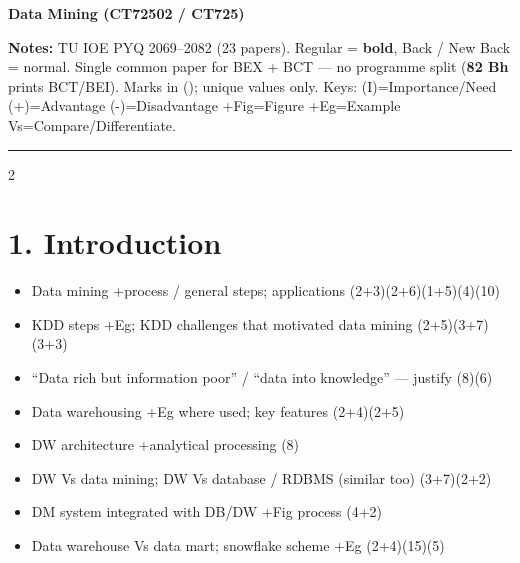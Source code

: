 \documentclass[10pt]{article}
\begin{document}
\begin{center}
  {\Large\bfseries Data Mining (CT72502 / CT725)} 
\end{center}
\vspace{2pt}
\small
\textbf{Notes:} TU IOE PYQ 2069--2082 (23 papers). Regular = \textbf{bold}, Back / New Back = normal.
Single common paper for BEX + BCT --- no programme split (\textbf{82 Bh} prints BCT/BEI).
Marks in (); unique values only.
Keys: (I)=Importance/Need \quad (+)=Advantage \quad (-)=Disadvantage \quad +Fig=Figure \quad +Eg=Example \quad Vs=Compare/Differentiate.
\vspace{2pt}
\hrule
\vspace{4pt}

\begin{multicols}{2}
\footnotesize

\section*{1. Introduction}
\begin{itemize}
  \item Data mining +process / general steps; applications \hfill (2+3)(2+6)(1+5)(4)(10)
  \item KDD steps +Eg; KDD challenges that motivated data mining \hfill (2+5)(3+7)(3+3)
  \item ``Data rich but information poor'' / ``data into knowledge'' --- justify \hfill (8)(6)
  \item Data warehousing +Eg where used; key features \hfill (2+4)(2+5)
  \item DW architecture +analytical processing \hfill (8)
  \item DW Vs data mining; DW Vs database / RDBMS (similar too) \hfill (3+7)(2+2)
  \item DM system integrated with DB/DW +Fig process \hfill (4+2)
  \item Data warehouse Vs data mart; snowflake scheme +Eg \hfill (2+4)(15)(5)
\end{itemize}


\end{multicols}
\end{document}

